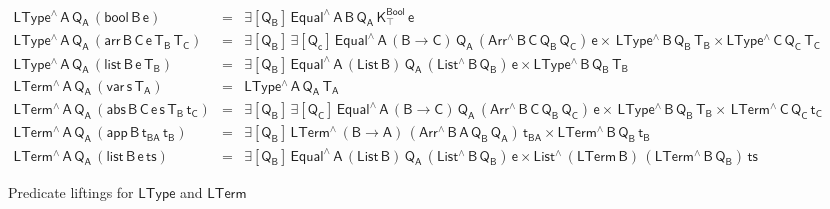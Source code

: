 \documentclass[9pt]{entcs}
\begin{document}
\begin{figure*}[t]

  \begin{adjustbox}{varwidth=6.8in, max width=6.6in, margin=-0.1in 0in
      -0.2in 0in, fbox, center} 
{\small
\[\begin{array}{lll}
\mathsf{LType^{\wedge}\,A\,Q_A\,(bool\,B\,e)} & = &\mathsf{\exists
  [Q_B]\, Equal^{\wedge}\, A\, B\, Q_A\, K^{Bool}_{\top} \,e}\\
\mathsf{LType^{\wedge}\,A\,Q_A\,(arr\, B\, C\, e\, T_B\, T_C)}
&=&\mathsf{\exists [Q_B] \,\exists [Q_c]\, Equal^{\wedge}\,A\,
  (B \to C)\, Q_A\, (Arr^{\wedge} \, B\, C\, Q_B \, Q_C) \, e \times
  \, LType^{\wedge}\,B\,Q_B\,T_B \times LType^{\wedge}\,C\,Q_C\,T_C}\\
\mathsf{LType^{\wedge}\,A\,Q_A\,(list\, B\, e\, T_B)} & = &
\mathsf{\exists [Q_B]\, Equal^{\wedge}\,A\, (List\, B)\, Q_A\,
  (List^{\wedge} \, B\, Q_B) \, e \times LType^{\wedge}\,B\,Q_B\,T_B}\\[1ex]
\mathsf{LTerm^{\wedge}\,A\,Q_A\,(var\,s\,T_A)} & = &
\mathsf{LType^{\wedge}\, A\, Q_A\, T_A}\\
\mathsf{LTerm^{\wedge}\,A\,Q_A\, (abs \,B \,C \,e \,s \,T_B \,t_C)} &
= & \mathsf{\exists [Q_B]\,\exists [Q_C]\, Equal^{\wedge} \, A\, (B \to
  C)\, Q_A\, (Arr^{\wedge} \, B\, C\, Q_B \, Q_C)\, e \times \,
  LType^{\wedge}\, B\, Q_B\, T_B \times \, LTerm^{\wedge}\, C\, Q_C\,
  t_C }\\
\mathsf{LTerm^{\wedge}\,A\,Q_A\, (app\, B\, t_{BA}\, t_B)} & = &
\mathsf{\exists [Q_B]\, LTerm^{\wedge}\, (B \to A)\, (Arr^{\wedge} \,
  B\, A\, Q_B \, Q_A)\, t_{BA} \times LTerm^{\wedge}\, B\, Q_B\,
  t_B}\\
\mathsf{LTerm^{\wedge}\,A\,Q_A\, (list\, B\, e\, ts)} & = &
\mathsf{\exists [Q_B]\, Equal^{\wedge} \, A\, (List\,B)\, Q_A\,
  (List^{\wedge} \, B\, Q_B) \, e \times List^{\wedge}\, (LTerm\,B) \,
  (LTerm^{\wedge} \, B\, Q_B) \, ts}
\end{array}   \]}

\vspace*{-0.1in}

\caption{Predicate liftings for $\mathsf{LType}$ and
  $\mathsf{LTerm}$}\label{fig:liftings} \vspace*{0.1in} 
\end{adjustbox}
\end{figure*}
\end{document}
